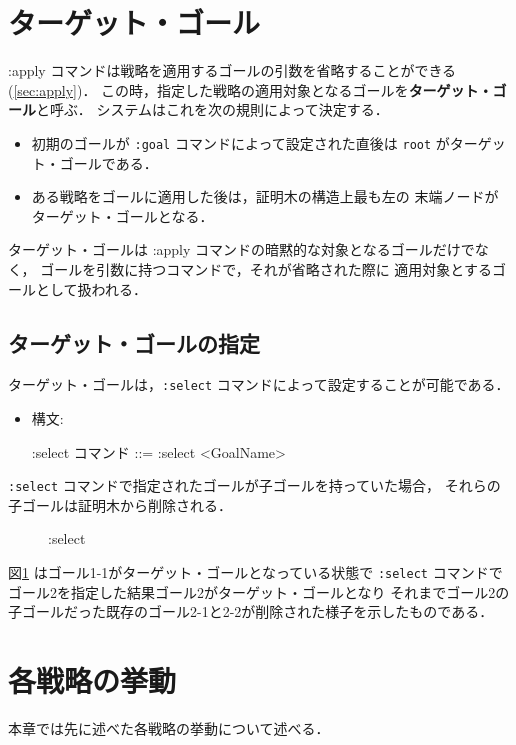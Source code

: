 \documentclass[a4paper,oneside,10pt,here]{memoir}
\newenvironment{vvtm}%
{\parskip=0pt\lineskip=0pt\begin{center}\begin{minipage}{0.8\textwidth}\begin{snugshade}}%
  {\end{snugshade}\end{minipage}\end{center}}
\begin{document}
\section{ターゲット・ゴール}\label{sec:default-goal}
:apply コマンドは戦略を適用するゴールの引数を省略することができる(\ref{sec:apply})．
この時，指定した戦略の適用対象となるゴールを\textbf{ターゲット・ゴール}と呼ぶ．
システムはこれを次の規則によって決定する．
\begin{itemize}
\item 初期のゴールが \verb|:goal| コマンドによって設定された直後は 
  \verb|root| がターゲット・ゴールである．
\item ある戦略をゴールに適用した後は，証明木の構造上最も左の
  末端ノードがターゲット・ゴールとなる．
\end{itemize}

ターゲット・ゴールは :apply コマンドの暗黙的な対象となるゴールだけでなく，
ゴールを引数に持つコマンドで，それが省略された際に%
適用対象とするゴールとして扱われる．

\subsection{ターゲット・ゴールの指定}
ターゲット・ゴールは，\verb|:select| コマンドによって設定することが可能である．
\begin{itemize}
\item 構文:
  \begin{vvtm}
    \begin{simplev}
  :select コマンド ::= :select <GoalName>      
    \end{simplev}
  \end{vvtm}
\end{itemize}
\verb|:select| コマンドで指定されたゴールが子ゴールを持っていた場合，
それらの子ゴールは証明木から削除される．
\begin{figure}[hbt]
  \centering
  
  \caption{:select}
  \label{fig:selected-proof-tree}
\end{figure}
図\ref{fig:selected-proof-tree} はゴール1-1がターゲット・ゴールとなっている状態で
\verb|:select| コマンドでゴール2を指定した結果ゴール2がターゲット・ゴールとなり
それまでゴール2の子ゴールだった既存のゴール2-1と2-2が削除された様子を示したものである．

\section{各戦略の挙動}\label{sec:tactic-behaviour}
本章では先に述べた各戦略の挙動について述べる．
\end{document}
